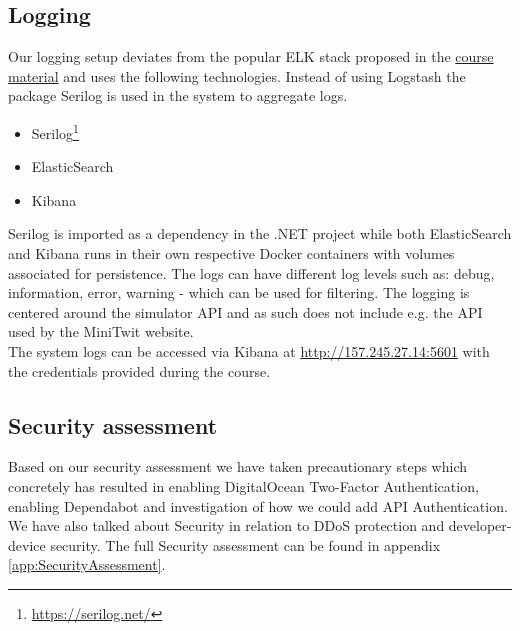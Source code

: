 \subsection{Logging}
Our logging setup deviates from the popular ELK stack proposed in the \href{https://github.com/itu-devops/itu-minitwit-logging}{course material} and uses the following technologies. Instead of using Logstash the package Serilog is used in the system to aggregate logs.
\begin{itemize}
    \item Serilog\footnote{\url{https://serilog.net/}}
    \item ElasticSearch
    \item Kibana 
\end{itemize}
Serilog is imported as a dependency in the .NET project while both ElasticSearch and Kibana runs in their own respective Docker containers with volumes associated for persistence. The logs can have different log levels such as: debug, information, error, warning - which can be used for filtering.
The logging is centered around the simulator API and as such does not include e.g. the API used by the MiniTwit website.\\ 
The system logs can be accessed via Kibana at \href{http://157.245.27.14:5601/login?next=\%2F}{http://157.245.27.14:5601} with the credentials provided during the course.



\subsection{Security assessment}
Based on our security assessment we have taken precautionary steps which concretely has resulted in enabling DigitalOcean Two-Factor Authentication, enabling Dependabot and investigation of how we could add API Authentication. We have also talked about Security in relation to DDoS protection and developer-device security. The full Security assessment can be found in appendix \ref{app:SecurityAssessment}.

